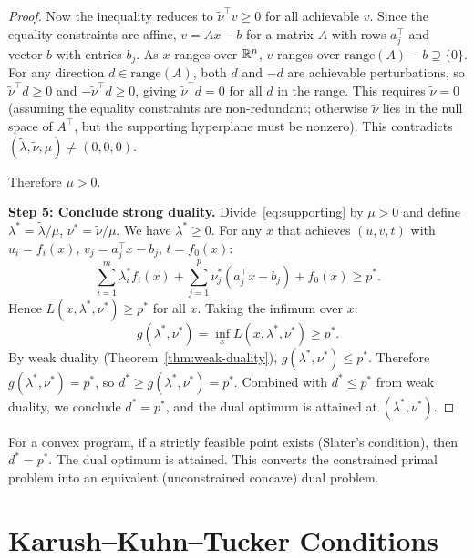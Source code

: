 \documentclass[11pt,a4paper]{article}
\begin{document}
\begin{proof}
Now the inequality reduces to $\tilde{\nu}^\top v \ge 0$ for all achievable
$v$. Since the equality constraints are affine, $v = Ax - b$ for a matrix
$A$ with rows $a_j^\top$ and vector $b$ with entries $b_j$. As $x$ ranges
over $\mathbb{R}^n$, $v$ ranges over $\text{range}(A) - b \supseteq \{0\}$. For any
direction $d \in \text{range}(A)$, both $d$ and $-d$ are achievable
perturbations, so $\tilde{\nu}^\top d \ge 0$ and
$-\tilde{\nu}^\top d \ge 0$, giving $\tilde{\nu}^\top d = 0$ for all $d$
in the range. This requires $\tilde{\nu} = 0$ (assuming the equality
constraints are non-redundant; otherwise $\tilde{\nu}$ lies in the null
space of $A^\top$, but the supporting hyperplane must be nonzero). This
contradicts $(\tilde{\lambda}, \tilde{\nu}, \mu) \neq (0,0,0)$.

Therefore $\mu > 0$.

\textbf{Step 5: Conclude strong duality.}
Divide~\eqref{eq:supporting} by $\mu > 0$ and define
$\lambda^* = \tilde{\lambda}/\mu$, $\nu^* = \tilde{\nu}/\mu$. We have
$\lambda^* \ge 0$. For any $x$ that achieves $(u, v, t)$
with $u_i = f_i(x)$, $v_j = a_j^\top x - b_j$, $t = f_0(x)$:
\[
  \sum_{i=1}^m \lambda^*_i f_i(x) + \sum_{j=1}^p \nu^*_j(a_j^\top x - b_j)
  + f_0(x) \ge p^*.
\]
Hence $L(x, \lambda^*, \nu^*) \ge p^*$ for all $x$. Taking the infimum
over $x$:
\[
  g(\lambda^*, \nu^*) = \inf_x L(x, \lambda^*, \nu^*) \ge p^*.
\]
By weak duality (Theorem~\ref{thm:weak-duality}), $g(\lambda^*, \nu^*) \le p^*$.
Therefore $g(\lambda^*, \nu^*) = p^*$, so $d^* \ge g(\lambda^*, \nu^*) = p^*$.
Combined with $d^* \le p^*$ from weak duality, we conclude $d^* = p^*$, and
the dual optimum is attained at $(\lambda^*, \nu^*)$.
\end{proof}

\begin{keyresult}[title={Strong Duality via Slater's Condition}]
For a convex program, if a strictly feasible point exists (Slater's condition),
then $d^* = p^*$. The dual optimum is attained. This converts the constrained
primal problem into an equivalent (unconstrained concave) dual problem.
\end{keyresult}


\section{Karush--Kuhn--Tucker Conditions}\label{sec:kkt}
\end{document}
